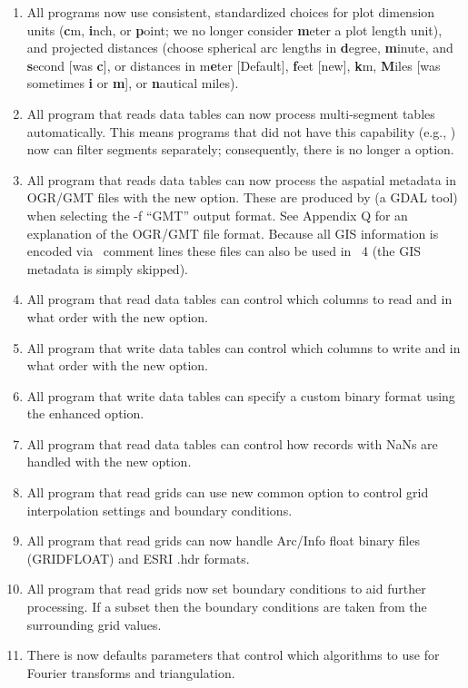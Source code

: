 \begin{enumerate}
	\item All programs now use consistent, standardized choices for plot dimension units (\textbf{c}m, \textbf{i}nch, or
	\textbf{p}oint;
		we no longer consider \textbf{m}eter a plot length unit), and projected distances (choose spherical arc lengths in \textbf{d}egree,
		\textbf{m}inute, and \textbf{s}econd [was \textbf{c}], or distances in m\textbf{e}ter [Default], \textbf{f}eet [new], 
		\textbf{k}m, \textbf{M}iles [was sometimes \textbf{i} or \textbf{m}], or \textbf{n}autical miles).
	\item All program that reads data tables can now process multi-segment tables automatically.  This means
		programs that did not have this capability (e.g., ) now can filter segments
		separately; consequently, there is no longer a  option.
	\item All program that reads data tables can now process the aspatial metadata in OGR/GMT files with the new  option.
		These are produced by  (a GDAL tool) when selecting the -f ``GMT'' output format.  See Appendix Q
		for an explanation of the OGR/GMT file format.  Because all GIS information is encoded via \GMT\ comment lines
		these files can also be used in \GMT\ 4 (the GIS metadata is simply skipped).
	\item All program that read data tables can control which columns to read and in what order with the new  option.
	\item All program that write data tables can control which columns to write and in what order with the new  option.
	\item All program that write data tables can specify a custom binary format using the enhanced  option.
	\item All program that read data tables can control how records with NaNs are handled with the new  option.
	\item All program that read grids can use new common option  to control grid interpolation settings and boundary conditions.
	\item All program that read grids can now handle Arc/Info float binary files (GRIDFLOAT) and ESRI .hdr formats.
	\item All program that read grids now set boundary conditions to aid further processing.  If a subset then the
		boundary conditions are taken from the surrounding grid values.
	\item There is now defaults parameters that control which algorithms to use for Fourier transforms and triangulation.

\end{enumerate}
